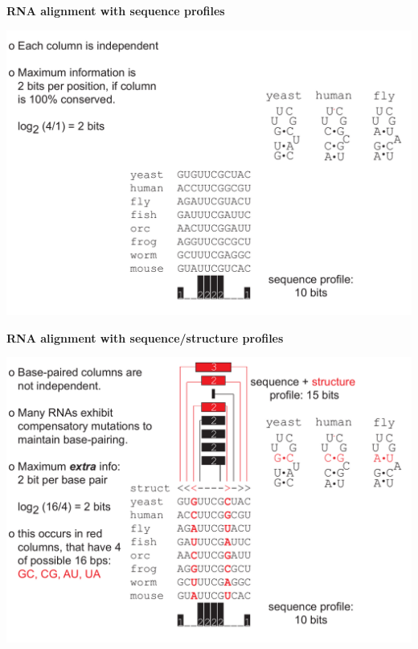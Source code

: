 \documentclass[landscape]{slides}
\begin{document}
\begin{slide}
\begin{center}
\textbf{RNA alignment with sequence profiles}
\end{center}
\medskip

\begin{center}
\includegraphics[width=10.5in]{figs/info_for_alignment_primary}
\end{center}

\end{slide}

\begin{slide}
\begin{center}
\textbf{RNA alignment with sequence/structure profiles}
\end{center}
\medskip

\begin{center}
\includegraphics[width=10.5in]{figs/info_for_alignment_structure}
\end{center}

\end{slide}
\end{document}
